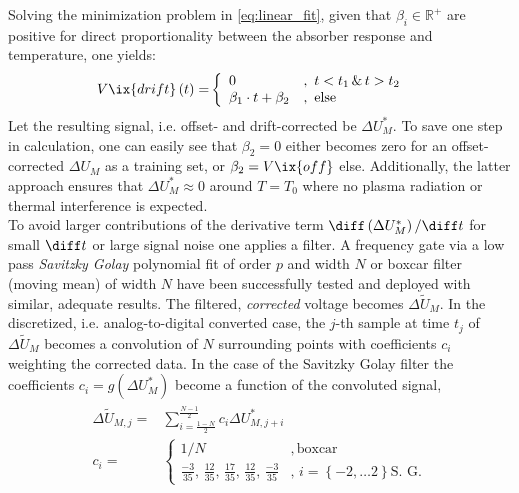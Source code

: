 % 
                Solving the minimization problem in \cref{eq:linear_fit}, given that $\beta_{i}\in\mathbb{R}^{+}$ are positive for direct proportionality between the absorber response and temperature, one yields:%
%
                \begin{align}%
                    V\ix{drift}\left(t\right)=&\left\{%
                    \begin{array}{ll}%
                        0&,\,\,t<t_{1}\,\&\,t>t_{2}\\%
                        \beta_{1}\cdot t+\beta_{2}&,\,\,\text{else}%
                    \end{array}\right.\label{eq:drift}%
                \end{align}%
%
                Let the resulting signal, i.e. offset- and drift-corrected be $\Delta U^{*}_{M}$. To save one step in calculation, one can easily see that $\beta_{2}=0$ either becomes zero for an offset-corrected $\Delta U_{M}$ as a training set, or $\beta_{2}=V\ix{off}$ else. Additionally, the latter approach ensures that $\Delta U^{*}_{M}\approx0$ around $T=T_{0}$ where no plasma radiation or thermal interference is expected.\\%
                To avoid larger contributions of the derivative term $\diff\left(\Delta U^{*}_{M}\right)/\diff t$ for small $\diff t$ or large signal noise one applies a filter. A frequency gate via a low pass \textit{Savitzky Golay} polynomial fit of order $p$ and width $N$ or boxcar filter (moving mean) of width $N$ have been successfully tested and deployed with similar, adequate results. The filtered, \textit{corrected} voltage becomes $\Delta\widetilde{U}_{M}$. In the discretized, i.e. analog-to-digital converted  case, the $j$-th sample at time $t_{j}$ of $\Delta\widetilde{U}_{M}$ becomes a convolution of $N$ surrounding points with coefficients $c_{i}$ weighting the corrected data. In the case of the Savitzky Golay filter the coefficients $c_{i}=g\left(\Delta U_{M}^{*}\right)$ become a function of the convoluted signal, %
%
                \begin{align}%
                    \begin{split}%
                        \Delta\widetilde{U}_{M,j}=&\sum_{i=\frac{1-N}{2}}^{\frac{N-1}{2}}c_{i}\Delta U^{*}_{M, j+i}\\%
                        c_{i}=&\left\{\begin{array}{ll}%
                            1/N&,\,\text{boxcar}\\%
                            \frac{-3}{35},\,\frac{12}{35},\,\frac{17}{35},\,\frac{12}{35},\,\frac{-3}{35}&,\,i=\left\{-2,\dots2\right\}\text{S. G.}%
                        \end{array}\right.%
                    \end{split}\label{eq:averaging}%
                \end{align}%
